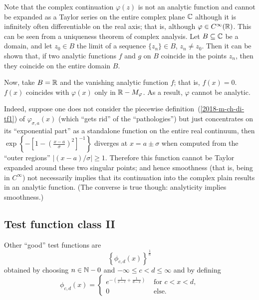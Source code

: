 {Note that the complex continuation
$\varphi (z)$ is not an analytic function and cannot be expanded as a Taylor series on the
entire complex plane ${\Bbb C}$ although it is infinitely often
differentiable on the real axis; that is, although
$\varphi\in C^\infty({\Bbb R})$.
This can be seen from a uniqueness theorem of complex analysis.
Let
 $B\subseteq{\Bbb C}$ be a domain, and
let
$z_0\in B$ the limit of a sequence
$\{z_n\}\in B$, $z_n\ne z_0$.
Then it can be shown that, if two
analytic functions
$f$ and $g$ on $B$  coincide in the points $z_n$,
then they coincide on the entire domain $B$.

Now, take  $B={\Bbb R}$ and
the  vanishing analytic function $f$; that is,
$f(x)=0$.
$f(x)$ coincides with $\varphi (x)$ only in
 ${\Bbb R} - M_\varphi$.
As a result, $\varphi$ cannot be analytic.

Indeed, suppose one does not consider  the piecewise definition~(\ref{2018-m-ch-di-tf1}) of $\varphi_{\sigma, a}(x)$
(which ``gets rid'' of the ``pathologies'')
but just concentrates on its ``exponential part'' as a standalone function on the entire real continuum,
then $\exp \left\{ -\left[ 1 - \left( \frac{x-a}{\sigma }\right)^2 \right]^{-1} \right\}$ diverges at $x=a\pm\sigma$  when
computed from the ``outer regions''  $\left\vert  (x-a)/ \sigma \right\vert \ge 1$.
Therefore this function cannot be Taylor expanded around these two singular points;
and hence smoothness (that is, being in  $C^\infty$)
not necessarily implies that its continuation into the complex plain results in an analytic function. (The converse is true though: analyticity implies smoothness.)
\eproof
}

\subsection{Test function class II}

Other ``good'' test functions are \cite{schwartz}
\begin{equation}
\left\{\phi_{c,d}(x)\right\}^\frac{1}{n}
\end{equation}
obtained by choosing $n\in {\Bbb N} - 0$
and $-\infty \le c<d\le \infty$ and by defining
\begin{equation}
\phi_{c,d}(x)
=
\begin{cases}
e^{-\left( \frac{1}{x-c} + \frac{1}{d-x} \right)} & \textrm{ for }  c<x<d ,   \\
                                                0 & \textrm{ else.}
\end{cases}
\end{equation}



